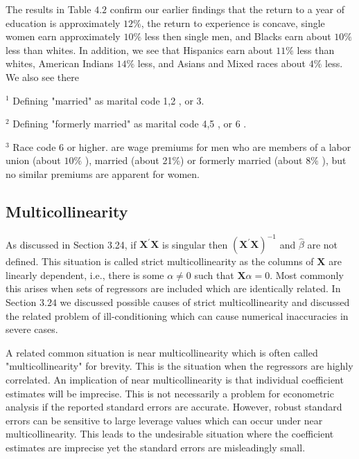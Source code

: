 \documentclass[10pt]{article}
\begin{document}
The results in Table $4.2$ confirm our earlier findings that the return to a year of education is approximately $12 \%$, the return to experience is concave, single women earn approximately $10 \%$ less then single men, and Blacks earn about $10 \%$ less than whites. In addition, we see that Hispanics earn about $11 \%$ less than whites, American Indians $14 \%$ less, and Asians and Mixed races about $4 \%$ less. We also see there

${ }^{1}$ Defining "married" as marital code 1,2 , or $3 .$

${ }^{2}$ Defining "formerly married" as marital code 4,5 , or 6 .

${ }^{3}$ Race code 6 or higher. are wage premiums for men who are members of a labor union (about $10 \%$ ), married (about 21\%) or formerly married (about $8 \%$ ), but no similar premiums are apparent for women.

\subsection{Multicollinearity}
As discussed in Section 3.24, if $\boldsymbol{X}^{\prime} \boldsymbol{X}$ is singular then $\left(\boldsymbol{X}^{\prime} \boldsymbol{X}\right)^{-1}$ and $\widehat{\beta}$ are not defined. This situation is called strict multicollinearity as the columns of $\boldsymbol{X}$ are linearly dependent, i.e., there is some $\alpha \neq 0$ such that $\boldsymbol{X} \alpha=0$. Most commonly this arises when sets of regressors are included which are identically related. In Section $3.24$ we discussed possible causes of strict multicollinearity and discussed the related problem of ill-conditioning which can cause numerical inaccuracies in severe cases.

A related common situation is near multicollinearity which is often called "multicollinearity" for brevity. This is the situation when the regressors are highly correlated. An implication of near multicollinearity is that individual coefficient estimates will be imprecise. This is not necessarily a problem for econometric analysis if the reported standard errors are accurate. However, robust standard errors can be sensitive to large leverage values which can occur under near multicollinearity. This leads to the undesirable situation where the coefficient estimates are imprecise yet the standard errors are misleadingly small.
\end{document}
